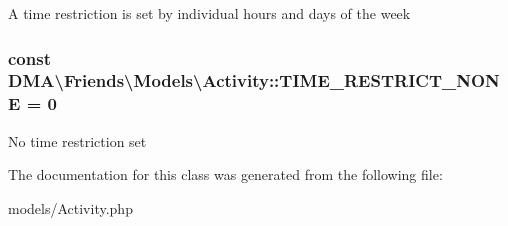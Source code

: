 A time restriction is set by individual hours and days of the week \hypertarget{classDMA_1_1Friends_1_1Models_1_1Activity_ab9dd8b18c4810beabdcf8e45039913c8}{
\subsubsection[{T\-I\-M\-E\-\_\-\-R\-E\-S\-T\-R\-I\-C\-T\-\_\-\-N\-O\-N\-E}]{\setlength{\rightskip}{0pt plus 5cm}const D\-M\-A\textbackslash{}\-Friends\textbackslash{}\-Models\textbackslash{}\-Activity\-::\-T\-I\-M\-E\-\_\-\-R\-E\-S\-T\-R\-I\-C\-T\-\_\-\-N\-O\-N\-E = 0}}\label{classDMA_1_1Friends_1_1Models_1_1Activity_ab9dd8b18c4810beabdcf8e45039913c8}
No time restriction set 

The documentation for this class was generated from the following file\-:\begin{DoxyCompactItemize}
\item 
models/Activity.\-php\end{DoxyCompactItemize}
